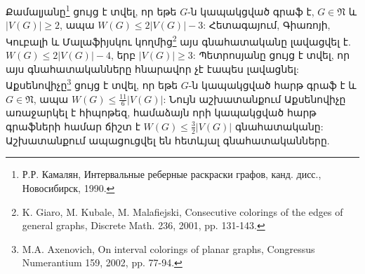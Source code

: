 Քամալյանը\footnote{Р.Р. Камалян, Интервальные реберные раскраски графов, канд. дисс., Новосибирск, 1990.} ցույց է տվել, որ եթե $G$-ն կապակցված գրաֆ է, $G\in \mathfrak{N}$ և $|V(G)|\geq 2$, ապա 
$W(G)\leq 2|V(G)|-3$: Հետագայում, Գիառոյի, Կուբալի և Մալաֆիյսկու կողմից\footnote{K. Giaro, M. Kubale, M. Malafiejski, Consecutive colorings of the edges of general graphs, Discrete Math. 236, 2001, pp. 131-143.} այս գնահատականը լավացվել է. $W(G)\leq 2|V(G)|-4$, երբ  $|V(G)|\geq 3$: Պետրոսյանը ցույց է տվել, որ այս գնահատականները հնարավոր չէ էապես լավացնել: Աքսենովիչը\footnote{M.A. Axenovich, On interval colorings of planar graphs, Congressus Numerantium 159, 2002, pp. 77-94.} ցույց է տվել, որ եթե $G$-ն կապակցված հարթ գրաֆ է և $G \in \mathfrak{N}$, ապա $W(G) \leq \frac{11}{6}|V(G)|$: Նույն աշխատանքում Աքսենովիչը առաջարկել է հիպոթեզ, համաձայն որի կապակցված հարթ գրաֆների համար ճիշտ է $W(G) \leq \frac{3}{2} |V(G)|$ գնահատականը: Աշխատանքում ապացուցվել են հետևյալ գնահատականները.

